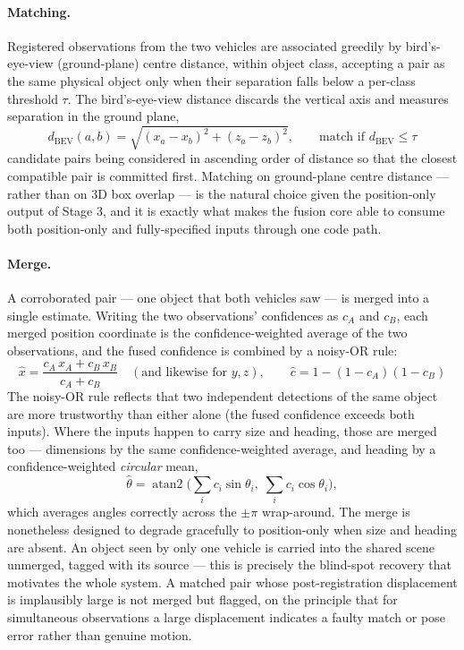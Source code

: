 \paragraph{Matching.} Registered observations from the two vehicles are associated
greedily by bird's-eye-view (ground-plane) centre distance, within object class,
accepting a pair as the same physical object only when their separation falls below
a per-class threshold $\tau$. The bird's-eye-view distance discards the vertical
axis and measures separation in the ground plane,
\begin{equation}
d_{\text{BEV}}(a, b) = \sqrt{(x_a - x_b)^2 + (z_a - z_b)^2}, \qquad
\text{match if } d_{\text{BEV}} \le \tau
\label{eq:bev}
\end{equation}
candidate pairs being considered in ascending order of distance so that the closest
compatible pair is committed first. Matching on ground-plane centre distance ---
rather than on 3D box overlap --- is the natural choice given the position-only
output of Stage 3, and it is exactly what makes the fusion core able to consume both
position-only and fully-specified inputs through one code path.

\paragraph{Merge.} A corroborated pair --- one object that both vehicles saw --- is
merged into a single estimate. Writing the two observations' confidences as $c_A$
and $c_B$, each merged position coordinate is the confidence-weighted average of the
two observations, and the fused confidence is combined by a noisy-OR rule:
\begin{equation}
\hat{x} = \frac{c_A\, x_A + c_B\, x_B}{c_A + c_B}
\quad (\text{and likewise for } y, z), \qquad
\hat{c} = 1 - (1 - c_A)(1 - c_B)
\label{eq:merge}
\end{equation}
The noisy-OR rule reflects that two independent detections of the same object are
more trustworthy than either alone (the fused confidence exceeds both inputs). Where
the inputs happen to carry size and heading, those are merged too --- dimensions by
the same confidence-weighted average, and heading by a confidence-weighted
\emph{circular} mean,
\begin{equation}
\hat{\theta} = \operatorname{atan2}\!\Big(\textstyle\sum_i c_i \sin\theta_i,\; \sum_i c_i \cos\theta_i\Big),
\label{eq:circmean}
\end{equation}
which averages angles correctly across the $\pm\pi$ wrap-around. The merge is
nonetheless designed to degrade gracefully to position-only when size and heading
are absent. An object seen by only one vehicle is carried into the shared scene
unmerged, tagged with its source --- this is precisely the blind-spot recovery that
motivates the whole system. A matched pair whose post-registration displacement is
implausibly large is not merged but flagged, on the principle that for
simultaneous observations a large displacement indicates a faulty match or pose
error rather than genuine motion.


